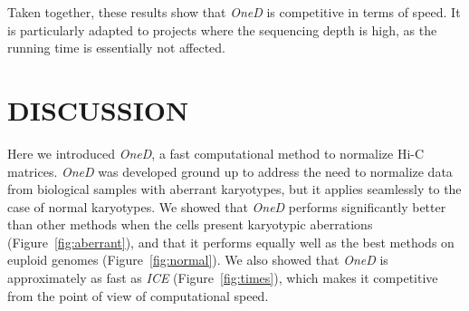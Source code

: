 \documentclass[a4,center,fleqn]{NAR}
\providecommand{\DIFadd}[1]{{\protect\color{red}#1}} %
\providecommand{\DIFdel}[1]{{\protect}}                      %
\providecommand{\DIFaddbegin}{} %
\providecommand{\DIFaddend}{} %
\providecommand{\DIFdelbegin}{} %
\providecommand{\DIFdelend}{} %
\providecommand{\DIFdelFL}[1]{\DIFdel{#1}} %
\begin{document}
\DIFaddend Taken together, these results show that \textit{OneD} is competitive in
terms of \DIFdelbegin \DIFdel{computational speedcompared
to existing methods}\DIFdelend \DIFaddbegin \DIFadd{speed. It is particularly adapted to projects where the
sequencing depth is high, as the running time is essentially not affected}\DIFaddend .



\DIFdelbegin %
{%
\DIFdelFL{Computing time of the bias correction methods. A. Total time for the
entire genome at 100 kbp resolution. Each dot corresponds to one sample.
The only method faster than ours under performs in all sample comparisons.
B. Time to correct a reduced genome (chr19-22) of one sample at different
resolutions. Note the logarithmic scale on the y-axis on both panels.}}

\DIFdelend \section{DISCUSSION}

Here we introduced \textit{OneD}, a fast computational method to normalize
Hi-C matrices. \textit{OneD} was developed ground up to address the need
to normalize data from biological samples with aberrant karyotypes, but it
applies seamlessly to the case of normal karyotypes. We showed that
\textit{OneD} performs significantly better than other methods when the
cells present karyotypic aberrations (Figure~\ref{fig:aberrant}), and that
it performs equally well as the best methods on euploid genomes
(Figure~\ref{fig:normal}). We also showed that \textit{OneD} is
approximately as fast as \textit{ICE} \DIFaddbegin \DIFadd{(Figure~\ref{fig:times})}\DIFaddend , which
makes it competitive from the point of view of computational speed.
\end{document}
